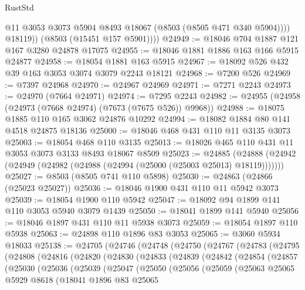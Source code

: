 \begin{lexlean}{RustStd}
\begin{coremodule}
{\begin{coremodule}
{{{{{{{{{{{{{{{{{{{{{{{{{{{{{{{{                @11
                @3053
                @3073
                @5904
                @8493
                @18067
                (@8503 (@8505 @471 @340 @5904))))
            @18119))
        (@8503 (@15451 @157 @5901))))
@24949 := @18046 @704 @1887 @121 @167 @3280 @24878 @17075
@24955 := @18046 @1881 @1886 @163 @166 @5915 @24877
@24958 := @18054 @1881 @163 @5915
@24967 := @18092 @526 @432 @39 @163 @3053 @3074 @3079 @2243 @18121
@24968 := @7200 @526
@24969 := @7397 @24968
@24970 := @24967 @24969
@24971 := @7271 @2243
@24973 := @24970 (@7664 @24971)
@24974 := @7295 @2243
@24982 := @24955 (@24958 (@24973 (@7668 @24974) (@7673 (@7675 @526)) @9968))
@24988 := @18075 @1885 @110 @165 @3062 @24876 @10292
@24994 := @18082 @1884 @80 @141 @4518 @24875 @18136
@25000 := @18046 @468 @431 @110 @11 @3135 @3073
@25003 := @18054 @468 @110 @3135
@25013 := @18026 @465 @110 @431 @11 @3053 @3073 @3133 @8493 @18067 @8509
@25023 := @24885
    (@24888 (@24942 (@24949 (@24982 (@24988 (@24994 (@25000 (@25003 @25013) @18119)))))))
@25027 := @8503 (@8505 @741 @110 @5898)
@25030 := @24863 (@24866 (@25023 @25027))
@25036 := @18046 @1900 @431 @110 @11 @5942 @3073
@25039 := @18054 @1900 @110 @5942
@25047 := @18092 @94 @1899 @141 @110 @3053 @5940 @3079 @1439
@25050 := @18041 @1899 @141 @5940
@25056 := @18046 @1897 @431 @110 @11 @5938 @3073
@25059 := @18054 @1897 @110 @5938
@25063 := @24898 @110 @1896 @83 @3053
@25065 := @3060 @5934 @18033
@25138 := @24705
    (@24746
      (@24748
        (@24750
          (@24767
            (@24783
              (@24795
                (@24808
                  (@24816
                    (@24820
                      (@24830
                        (@24833
                          (@24839
                            (@24842
                              (@24854
                                (@24857
                                  (@25030
                                    (@25036
                                      (@25039
                                        (@25047
                                          (@25050
                                            (@25056
                                              (@25059
                                                (@25063
                                                  @25065
                                                  @5929
                                                  @8618
                                                  (@18041
                                                    @1896
                                                    @83
                                                    @25065
}}}}}}}}}}}}}}}}}}}}}}}}}}}}}}}}
\end{coremodule}}
\end{coremodule}
\end{lexlean}
